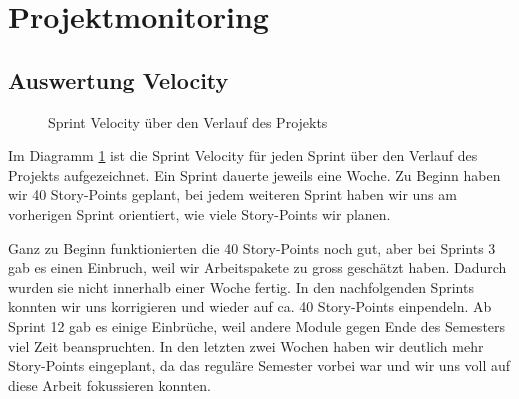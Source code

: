 \section{Projektmonitoring}
\label{sec:Projektmonitoring}

\subsection{Auswertung Velocity}
\label{sub:Auswertung Velocity}

\begin{figure}[H]
    \centering

    \caption[Diagramm Velocity über das Projekt]{Sprint Velocity über den Verlauf des Projekts}
    \label{chart:sprint_velocity}
\end{figure}

Im Diagramm \ref{chart:sprint_velocity} ist die Sprint Velocity für jeden Sprint über den Verlauf des Projekts aufgezeichnet.
Ein Sprint dauerte jeweils eine Woche.
Zu Beginn haben wir 40 Story-Points geplant, bei jedem weiteren Sprint haben wir uns am vorherigen Sprint orientiert, wie viele Story-Points wir planen.

Ganz zu Beginn funktionierten die 40 Story-Points noch gut, aber bei Sprints 3 gab es einen Einbruch, weil wir Arbeitspakete zu gross geschätzt haben.
Dadurch wurden sie nicht innerhalb einer Woche fertig.
In den nachfolgenden Sprints konnten wir uns korrigieren und wieder auf ca. 40 Story-Points einpendeln.
Ab Sprint 12 gab es einige Einbrüche, weil andere Module gegen Ende des Semesters viel Zeit beanspruchten.
In den letzten zwei Wochen haben wir deutlich mehr Story-Points eingeplant, da das reguläre Semester vorbei war und wir uns voll auf diese Arbeit fokussieren konnten.

